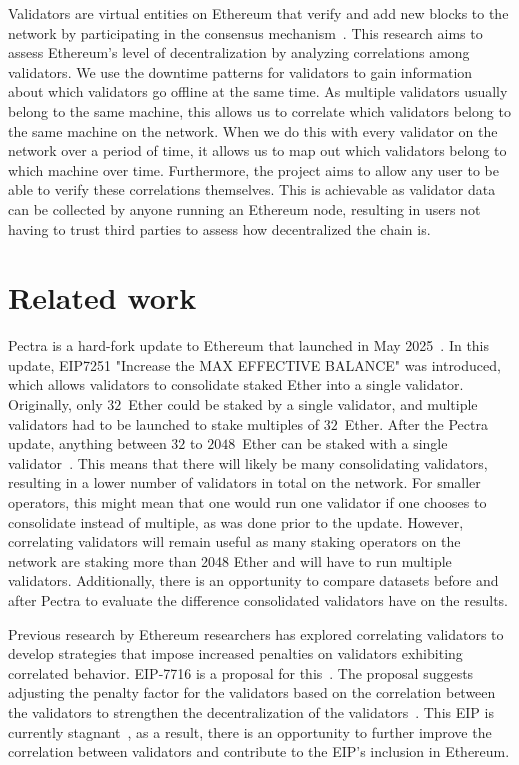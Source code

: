 \documentclass[runningheads]{llncs}
\begin{document}
Validators are virtual entities on Ethereum that verify and add new blocks to the network by participating in the consensus mechanism~\cite{staking2025}.
This research aims to assess Ethereum's level of decentralization by analyzing correlations among validators.
We use the downtime patterns for validators to gain information about which validators go offline at the same time.
As multiple validators usually belong to the same machine, this allows us to correlate which validators belong to the same machine on the network.
When we do this with every validator on the network over a period of time, it allows us to map out which validators belong to which machine over time.
Furthermore, the project aims to allow any user to be able to verify these correlations themselves.
This is achievable as validator data can be collected by anyone running an Ethereum node, resulting in users not having to trust third parties to assess how decentralized the chain is.

\section{Related work}
Pectra is a hard-fork update to Ethereum that launched in May 2025~\cite{exec_meeting208_2025}.
In this update, EIP7251 "Increase the MAX EFFECTIVE BALANCE" was introduced, which allows validators to consolidate staked Ether into a single validator.
Originally, only $32$~Ether could be staked by a single validator, and multiple validators had to be launched to stake multiples of $32$~Ether.
After the Pectra update, anything between $32$ to $2048$~Ether can be staked with a single validator~\cite{eip7251_2023}.
This means that there will likely be many consolidating validators, resulting in a lower number of validators in total on the network. For smaller operators, this might mean that one would run one validator if one chooses to consolidate instead of multiple, as was done prior to the update.
However, correlating validators will remain useful as many staking operators on the network are staking more than 2048 Ether and will have to run multiple validators. 
Additionally, there is an opportunity to compare datasets before and after Pectra to evaluate the difference consolidated validators have on the results.

Previous research by Ethereum researchers has explored correlating validators to develop strategies that impose increased penalties on validators exhibiting correlated behavior.
EIP-7716 is a proposal for this~\cite{eip7716_2024_vitalikethresear}. The proposal suggests adjusting the penalty factor for the validators based on the correlation between the validators to strengthen the decentralization of the validators~\cite{eip7716_2024_ethresear}. This EIP is currently stagnant~\cite{eip7716_2024}, as a result, there is an opportunity to further improve the correlation between validators and contribute to the EIP's inclusion in Ethereum. 
\end{document}
